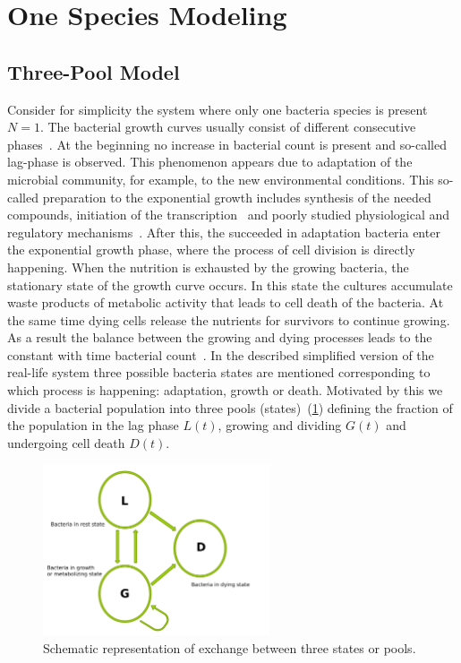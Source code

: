 \documentclass[10pt,A4paper]{article}
\numberwithin{equation}{section}
\begin{document}
\section{One Species Modeling}
\subsection{Three-Pool Model}
Consider for simplicity the system where only one bacteria species is present $N=1$.
The bacterial growth curves usually consist of different consecutive phases~\cite{buchanan_when_1997}.
At the beginning no increase in bacterial count is present and so-called lag-phase is observed.
This phenomenon appears due to adaptation of the microbial community, for example, to the new environmental conditions.
This so-called preparation to the exponential growth includes synthesis of the needed compounds, initiation of the transcription~\cite{rolfe_lag_2012} and poorly studied physiological and regulatory mechanisms~\cite{monod_growth_1949}.
After this, the succeeded in adaptation bacteria enter the exponential growth phase, where the process of cell division is directly happening.
When the nutrition is exhausted by the growing bacteria, the stationary state of the growth curve occurs.
In this state the cultures accumulate waste products of metabolic activity that leads to cell death of the bacteria.
At the same time dying cells release the nutrients for survivors to continue growing.
As a result the balance between the growing and dying processes leads to the constant with time bacterial count~\cite{navarro_llorens_stationary_2010}.
In the described simplified version of the real-life system three possible bacteria states are mentioned corresponding to which process is happening: adaptation, growth or death.
Motivated by this we divide a bacterial population into three pools (states)~(\ref{fig:SchematicRep}) defining the fraction of the population in the lag phase $L(t)$, growing and dividing $G(t)$ and undergoing cell death $D(t)$.
\begin{figure}[t]
    \begin{center}
    \includegraphics[width=0.6\textwidth]{Figures/TPM_fig.pdf}
    \caption{Schematic representation of exchange between three states or pools.}
    \label{fig:SchematicRep}
    \end{center}
\end{figure}
\end{document}
